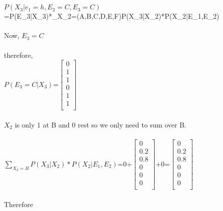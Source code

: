 \documentclass[11pt,a4paper]{article}
\begin{document}
\\\\
$P(X_{3}|e_{1}=h, E_{2}=C, E_{3}=C)$\\
=\alpha*P(E_{3}|X_{3})*\sum_{X_{2}=(A,B,C,D,E,F)}P(X_{3}|X_{2})*P(X_{2}|E_{1},E_{2})\\\\
Now, $E_{3}=C$\\\\
therefore,\\
$P(E_{3}=C|X_{3})$=$\begin{bmatrix}
0\\
1\\
1\\
0\\
1\\
1\\
\end{bmatrix}$\\\\
$X_{2}$ is only 1 at B and 0 rest so we only need to sum over B.\\\\
$\sum_{X_{2}=B}P(X_{3}|X_{2})*P(X_{2}|E_{1},E_{2})$=0+$\begin{bmatrix}
0\\
0.2\\
0.8\\
0\\
0\\
0\\
\end{bmatrix}$+0=$\begin{bmatrix}
0\\
0.2\\
0.8\\
0\\
0\\
0\\
\end{bmatrix}$\\\\
Therefore\\
\end{document}
